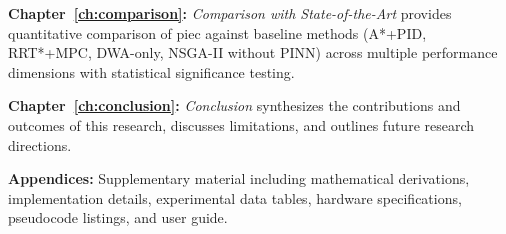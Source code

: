 \textbf{Chapter~\ref{ch:comparison}:} \textit{Comparison with State-of-the-Art} provides quantitative comparison of \acrshort{piec} against baseline methods (A*+PID, RRT*+MPC, DWA-only, NSGA-II without PINN) across multiple performance dimensions with statistical significance testing.

\textbf{Chapter~\ref{ch:conclusion}:} \textit{Conclusion} synthesizes the contributions and outcomes of this research, discusses limitations, and outlines future research directions.

\textbf{Appendices:} Supplementary material including mathematical derivations, implementation details, experimental data tables, hardware specifications, pseudocode listings, and user guide.

